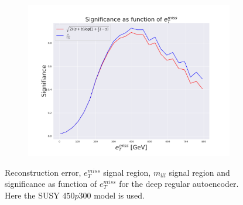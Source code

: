 \begin{figure}[H]
    \hfill  
    \begin{subfigure}{.40\textwidth}
        \includegraphics[width=\textwidth]{Figures/VAE_testing/small/2lep/significance_etmiss_450p0p0300_-0.4242401749818261.pdf}
        \caption{}
        \label{fig:VAE_2lep_small_signi_450_3}
    \end{subfigure}
    \hfill      
    \caption[2lep shallow network | $450p300$ | VAE | 3]{Reconstruction error, $e_T^{miss}$ signal region, $m_{lll}$ signal region and significance as function of 
    $e_T^{miss}$ for the deep regular autoencoder. Here the SUSY $450p300$ model is used.}
    \label{fig:VAE_2lep_small_rec_sig_signi_450_3}
\end{figure}



